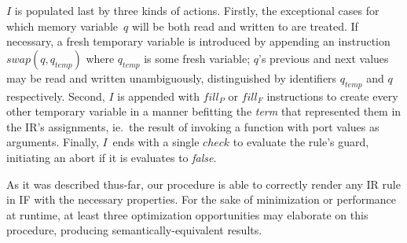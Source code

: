 $I$ is populated last by three kinds of actions. Firstly, the exceptional cases for which memory variable~$q$ will be both read and written to are treated. If necessary, a fresh temporary variable is introduced by appending an instruction $swap(q, q_{temp})$ where $q_{temp}$ is some fresh variable; $q$'s previous and next values may be read and written unambiguously, distinguished by identifiers $q_{temp}$ and $q$ respectively. Second, $I$ is appended with $fill_P$ or $fill_F$ instructions to create every other temporary variable in a manner befitting the \textit{term} that represented them in the IR's assignments, ie.\ the result of invoking a function with port values as arguments. Finally, $I$~ends with a single $check$ to evaluate the rule's guard, initiating an abort if it is evaluates to \textit{false}.

As it was described thus-far, our procedure is able to correctly render any IR rule in IF with the necessary properties. For the sake of minimization or performance at runtime, at least three optimization opportunities may elaborate on this procedure, producing semantically-equivalent results.

